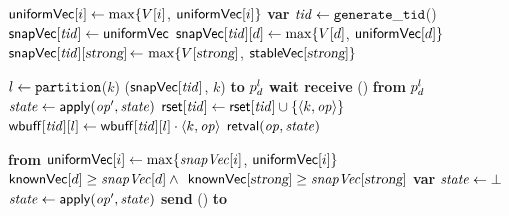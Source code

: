 \begin{algorithm}
  \renewcommand{\SpaceHandler}{\vspace{5pt}}
  \begin{algorithmic}[1]
    \small
    \Function{\STARTTX}{\avc}\label{line:starttx:call}
      \label{line:starttx:start}
        \State $\uniformsnapshot[i] \gets
          \max\{\avc[i]$, ${\sf uniformVec}[i]\}$\label{line:starttx:end}
      \EndFor
       \State \textbf{var} $\tx \gets \newtxid$()
      \State $\vecsnapshottime[\tx] \gets \uniformsnapshot$\label{alg:coord:starttx:init}
      \State $\vecsnapshottime[\tx][d] \gets
        \max\{\avc[d]$, ${\sf uniformVec}[d]\}$ \label{alg:coord:starttx:end}
      \State \colorbox{\BackColor}{{\color{\StrongColor}
        $\vecsnapshottime[\tx][\red] \,{\gets}\,
        \max\{\avc[\red]$, ${\sf stableVec}[\textsl{strong}]\}$}}\label{alg:coord:starttx:end-red}
      \State \Return \tx
    \EndFunction

    \SpaceHandler

    \label{alg:coord:execop}
       $l \gets \mathtt{partition}$($k$)
        \EXECOP($\vecsnapshottime[\tx]$, $k$)
        \textbf{to} $\partition^\areplica_d$\label{alg:coord:sendop}
      \State \textbf{wait receive} \OPRET(\cstate)
      \textbf{from} $\partition^\areplica_d$\label{line:coord:receive-ret}
        $\cstate \gets \apply(\op', \cstate)$\!\!
      \EndFor \label{line:formversion:end}
      \State \colorbox{\BackColor}{{\color{\StrongColor} $\readset[\tx] \gets \readset[\tx] \cup
        \{ \langle k, \op \rangle\}$}}\label{line:readset}
        \State $\writeset[\tx][\areplica] \gets
          \writeset[\tx][\areplica] \cdot \langle k, \op \rangle$
      \EndIf
      \State \Return $\effval{\op}{\cstate}$
    \EndFunction

   \SpaceHandler

    \textbf{from} \partition \label{line:updateuniformop:receive}
      \label{line:updateuniformop:start}
        \State $\uniformsnapshot[i] \gets \max\{\avecsnapshottime[i]$,
          ${\sf uniformVec}[i]\}$\label{line:updateuniformop:end}
      \EndFor
        $\replicavectorclock[d] \geq \avecsnapshottime[d] \wedge {}$\label{line:waitexecute}
          \Statex \hspace{1.69cm}\colorbox{\BackColor}{{\color{\StrongColor} $\replicavectorclock[\red]
        \geq \avecsnapshottime[\red]$}}
      \State \textbf{var} $\cstate \gets \bot$
        \State $\cstate \gets \apply(\op',\cstate)$
      \EndFor
      \State
        \textbf{send}
        \OPRET(\cstate)
        \textbf{to} \partition
    \EndWhenRcv


\end{algorithmic}
\end{algorithm}
